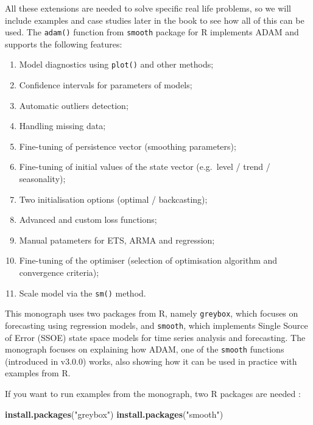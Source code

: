 \documentclass[]{book}
\newenvironment{Shaded}{\begin{snugshade}}{\end{snugshade}}
\newcommand{\KeywordTok}[1]{\textcolor[rgb]{0.13,0.29,0.53}{\textbf{#1}}}
\newcommand{\NormalTok}[1]{#1}
\newcommand{\StringTok}[1]{\textcolor[rgb]{0.31,0.60,0.02}{#1}}
\providecommand{\tightlist}{%
  \setlength{\itemsep}{0pt}\setlength{\parskip}{0pt}}
\theoremstyle{definition}
\theoremstyle{definition}
\theoremstyle{definition}
\theoremstyle{definition}
\theoremstyle{remark}
\begin{document}
All these extensions are needed to solve specific real life problems, so we will include examples and case studies later in the book to see how all of this can be used. The \texttt{adam()} function from \texttt{smooth} package for R implements ADAM and supports the following features:

\begin{enumerate}
\def\labelenumi{\arabic{enumi}.}
\tightlist
\item
  Model diagnostics using \texttt{plot()} and other methods;
\item
  Confidence intervals for parameters of models;
\item
  Automatic outliers detection;
\item
  Handling missing data;
\item
  Fine-tuning of persistence vector (smoothing parameters);
\item
  Fine-tuning of initial values of the state vector (e.g.~level / trend / seasonality);
\item
  Two initialisation options (optimal / backcasting);
\item
  Advanced and custom loss functions;
\item
  Manual patameters for ETS, ARMA and regression;
\item
  Fine-tuning of the optimiser (selection of optimisation algorithm and convergence criteria);
\item
  Scale model via the \texttt{sm()} method.
\end{enumerate}

This monograph uses two packages from R, namely \texttt{greybox}, which focuses on forecasting using regression models, and \texttt{smooth}, which implements Single Source of Error (SSOE) state space models for time series analysis and forecasting. The monograph focuses on explaining how ADAM, one of the \texttt{smooth} functions (introduced in v3.0.0) works, also showing how it can be used in practice with examples from R.

If you want to run examples from the monograph, two R packages are needed \citep{R-greybox, R-smooth}:

\begin{Shaded}
\begin{Highlighting}[]
\KeywordTok{install.packages}\NormalTok{(}\StringTok{"greybox"}\NormalTok{)}
\KeywordTok{install.packages}\NormalTok{(}\StringTok{"smooth"}\NormalTok{)}
\end{Highlighting}
\end{Shaded}
\end{document}
